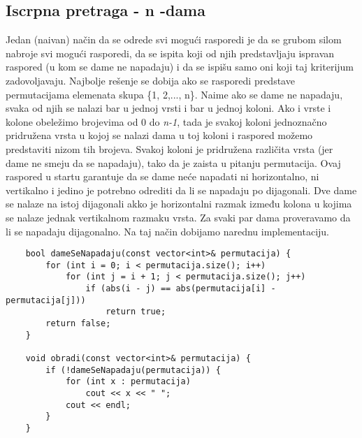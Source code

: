 \documentclass{article}
\begin{document}
\subsection{Iscrpna pretraga - n -dama}
Jedan (naivan) način da se odrede svi mogući rasporedi je da se grubom silom
nabroje svi mogući rasporedi, da se ispita koji od njih predstavljaju ispravan
raspored (u kom se dame ne napadaju) i da se ispišu samo oni koji taj kriterijum
zadovoljavaju. Najbolje rešenje se
dobija ako se rasporedi predstave permutacijama elemenata skupa 
\{1, 2,..., n\}.
Naime ako se dame ne napadaju, svaka od njih se nalazi bar u jednoj vrsti i bar
u jednoj koloni. Ako i vrste i kolone obeležimo brojevima od 0 do \textit{n-1}, tada je
svakoj koloni jednoznačno pridružena vrsta u kojoj se nalazi dama u toj koloni
i raspored možemo predstaviti nizom tih brojeva. Svakoj koloni je pridružena
različita vrsta (jer dame ne smeju da se napadaju), tako da je zaista u pitanju
permutacija. Ovaj raspored u startu garantuje da se dame neće napadati ni
horizontalno, ni vertikalno i jedino je potrebno odrediti da li se napadaju po
dijagonali. Dve dame se nalaze na istoj dijagonali akko je horizontalni razmak
između kolona u kojima se nalaze jednak vertikalnom razmaku vrsta. Za svaki
par dama proveravamo da li se napadaju dijagonalno. Na taj način dobijamo
narednu implementaciju.
\begin{lstlisting}
    bool dameSeNapadaju(const vector<int>& permutacija) {
        for (int i = 0; i < permutacija.size(); i++)
            for (int j = i + 1; j < permutacija.size(); j++)
                if (abs(i - j) == abs(permutacija[i] - permutacija[j]))
                    return true;
        return false;
    }

    void obradi(const vector<int>& permutacija) {
        if (!dameSeNapadaju(permutacija)) {
            for (int x : permutacija)
                cout << x << " ";
            cout << endl;
        }
    }
\end{lstlisting}
\end{document}
